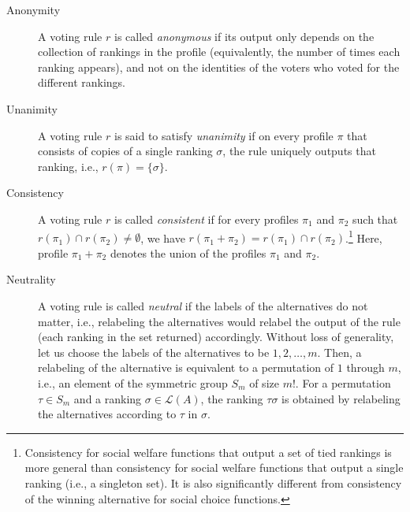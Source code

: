 \documentclass[prodmode,acmec]{ec-acmsmall}
\newcommand{\calL}{{\mathcal{L}}}
\newcommand{\rank}{{\calL(A)}}
\begin{document}
\begin{description}
\item[Anonymity] A voting rule $r$ is called \emph{anonymous} if its output only depends on the collection of rankings in the profile (equivalently, the number of times each ranking appears), and not on the identities of the voters who voted for the different rankings. \\ %

\item[Unanimity] A voting rule $r$ is said to satisfy \emph{unanimity} if on every profile $\pi$ that consists of copies of a single ranking $\sigma$, the rule uniquely outputs that ranking, i.e., $r(\pi) = \{\sigma\}$.\\ %

\item[Consistency] A voting rule $r$ is called \emph{consistent} if for every profiles $\pi_1$ and $\pi_2$ such that $r(\pi_1) \cap r(\pi_2) \neq \emptyset$, we have $r(\pi_1+\pi_2) = r(\pi_1) \cap r(\pi_2)$.\footnote{Consistency for social welfare functions that output a set of tied rankings is more general than consistency for social welfare functions that output a single ranking (i.e., a singleton set). It is also significantly different from consistency of the winning alternative for social choice functions.} Here, profile $\pi_1+\pi_2$ denotes the union of the profiles $\pi_1$ and $\pi_2$. \\ %

\item[Neutrality] A voting rule is called \emph{neutral} if the labels of the alternatives do not matter, i.e., relabeling the alternatives would relabel the output of the rule (each ranking in the set returned) accordingly. Without loss of generality, let us choose the labels of the alternatives to be $1,2,\ldots,m$. Then, a relabeling of the alternative is equivalent to a permutation of $1$ through $m$, i.e., an element of the symmetric group $S_m$ of size $m!$. For a permutation $\tau \in S_m$ and a ranking $\sigma \in \rank$, the ranking $\tau\sigma$ is obtained by relabeling the alternatives according to $\tau$ in $\sigma$. 


\end{description}
\end{document}
